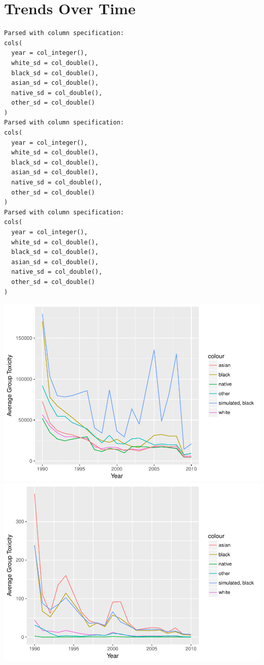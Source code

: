 \documentclass[12pt,twoside]{dukestatscithesis}
\theoremstyle{definition}
\theoremstyle{definition}
\theoremstyle{definition}
\theoremstyle{remark}
\begin{document}
\section{Trends Over Time}\label{trends-over-time}
\begin{verbatim}
Parsed with column specification:
cols(
  year = col_integer(),
  white_sd = col_double(),
  black_sd = col_double(),
  asian_sd = col_double(),
  native_sd = col_double(),
  other_sd = col_double()
)
Parsed with column specification:
cols(
  year = col_integer(),
  white_sd = col_double(),
  black_sd = col_double(),
  asian_sd = col_double(),
  native_sd = col_double(),
  other_sd = col_double()
)
Parsed with column specification:
cols(
  year = col_integer(),
  white_sd = col_double(),
  black_sd = col_double(),
  asian_sd = col_double(),
  native_sd = col_double(),
  other_sd = col_double()
)
\end{verbatim}
\includegraphics{thesis_files/figure-latex/unnamed-chunk-4-1.pdf}
\includegraphics{thesis_files/figure-latex/unnamed-chunk-4-2.pdf}
\end{document}
